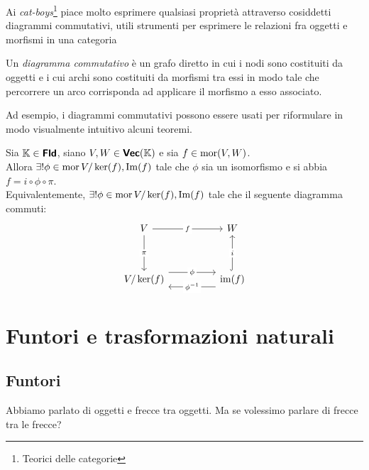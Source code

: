 \documentclass{article}
\begin{document}
Ai \textit{cat-boys}\footnote{Teorici delle categorie} piace molto esprimere qualsiasi proprietà attraverso cosiddetti diagrammi commutativi, utili strumenti per esprimere le relazioni fra oggetti e morfismi in una categoria

\begin{definition}
    Un \emph{diagramma commutativo} è un grafo diretto in cui i nodi sono costituiti da oggetti e i cui archi sono costituiti da morfismi tra essi in modo tale che percorrere un arco corrisponda ad applicare il morfismo a esso associato. 
\end{definition}

Ad esempio, i diagrammi commutativi possono essere usati per riformulare in modo visualmente intuitivo alcuni teoremi.

\begin{theorem}
    Sia $\mathbb{K} \in \text{\sffamily\textbf{Fld}}$, siano $V,W \in \text{\sffamily\textbf{Vec}}(\mathbb{K})$ e sia $f \in \operatorname{mor}(V,W)$.\\
    Allora $\exists! \phi \in \operatorname{mor}{V/\ker(f), \operatorname{Im}(f)}$ tale che $\phi$ sia un isomorfismo e si abbia $f = i \circ \phi \circ \pi$.\\
    Equivalentemente, $\exists! \phi \in \operatorname{mor}{V/\ker(f), \operatorname{Im}(f)}$ tale che il seguente diagramma commuti:
    \[\begin{tikzcd}
        V && W \\
        \\
        {V/\ker(f)} && {\operatorname{im}(f)}
        \arrow["f"{description}, from=1-1, to=1-3]
        \arrow["\pi"{description}, from=1-1, to=3-1]
        \arrow["\phi"{description}, shift left=3, from=3-1, to=3-3]
        \arrow["i"{description}, hook, from=3-3, to=1-3]
        \arrow["{\phi^{-1}}"{description}, shift left=3, from=3-3, to=3-1]
    \end{tikzcd}\]
\end{theorem}

\section{Funtori e trasformazioni naturali}
\label{Sec:Functors}

\subsection{Funtori}

Abbiamo parlato di oggetti e frecce tra oggetti. Ma se volessimo parlare di frecce tra le frecce?
\end{document}
